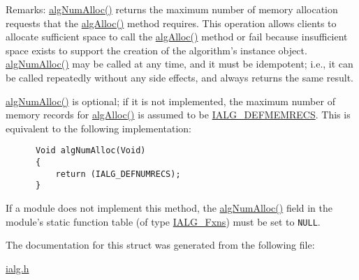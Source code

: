 \begin{Desc}
\item[Remarks:]\hyperlink{struct_i_a_l_g___fxns_098c1ca275465bb4acc1d3d0cf060160}{alg\-Num\-Alloc()} returns the maximum number of memory allocation requests that the \hyperlink{struct_i_a_l_g___fxns_1640ba8f4033af1ce3887283c7a12746}{alg\-Alloc()} method requires. This operation allows clients to allocate sufficient space to call the \hyperlink{struct_i_a_l_g___fxns_1640ba8f4033af1ce3887283c7a12746}{alg\-Alloc()} method or fail because insufficient space exists to support the creation of the algorithm's instance object. \hyperlink{struct_i_a_l_g___fxns_098c1ca275465bb4acc1d3d0cf060160}{alg\-Num\-Alloc()} may be called at any time, and it must be idempotent; i.e., it can be called repeatedly without any side effects, and always returns the same result.

\hyperlink{struct_i_a_l_g___fxns_098c1ca275465bb4acc1d3d0cf060160}{alg\-Num\-Alloc()} is optional; if it is not implemented, the maximum number of memory records for \hyperlink{struct_i_a_l_g___fxns_1640ba8f4033af1ce3887283c7a12746}{alg\-Alloc()} is assumed to be \hyperlink{group__ti__xdais___i_a_l_g_g8a220fa863380937542f6a38be47ceda}{IALG\_\-DEFMEMRECS}. This is equivalent to the following implementation: 

\begin{Code}\begin{verbatim}      Void algNumAlloc(Void)
      {
          return (IALG_DEFNUMRECS);
      }
\end{verbatim}\end{Code}



If a module does not implement this method, the \hyperlink{struct_i_a_l_g___fxns_098c1ca275465bb4acc1d3d0cf060160}{alg\-Num\-Alloc()} field in the module's static function table (of type \hyperlink{struct_i_a_l_g___fxns}{IALG\_\-Fxns}) must be set to {\tt NULL}. \end{Desc}


The documentation for this struct was generated from the following file:\begin{CompactItemize}
\item 
\hyperlink{ialg_8h}{ialg.h}\end{CompactItemize}
